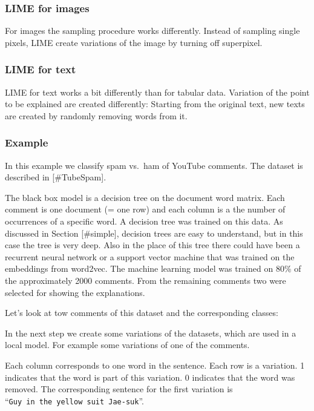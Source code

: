 \documentclass[12pt,]{krantz}
\theoremstyle{definition}
\theoremstyle{definition}
\theoremstyle{definition}
\theoremstyle{remark}
\begin{document}
\subsubsection{LIME for images}\label{lime-for-images}

For images the sampling procedure works differently. Instead of sampling
single pixels, LIME create variations of the image by turning off
superpixel.

\subsubsection{LIME for text}\label{lime-for-text}

LIME for text works a bit differently than for tabular data. Variation
of the point to be explained are created differently: Starting from the
original text, new texts are created by randomly removing words from it.

\subsubsection{Example}\label{example-4}

In this example we classify spam vs.~ham of YouTube comments. The
dataset is described in {[}\#TubeSpam{]}.

The black box model is a decision tree on the document word matrix. Each
comment is one document (= one row) and each column is a the number of
occurrences of a specific word. A decision tree was trained on this
data. As discussed in Section {[}\#simple{]}, decision trees are easy to
understand, but in this case the tree is very deep. Also in the place of
this tree there could have been a recurrent neural network or a support
vector machine that was trained on the embeddings from word2vec. The
machine learning model was trained on 80\% of the approximately 2000
comments. From the remaining comments two were selected for showing the
explanations.

Let's look at tow comments of this dataset and the corresponding
classes:

\hypertarget{htmlwidget-a7e2e3f97b18ee50788e}{}

In the next step we create some variations of the datasets, which are
used in a local model. For example some variations of one of the
comments.

\hypertarget{htmlwidget-d2a25d7a243dd7d0fdba}{}

Each column corresponds to one word in the sentence. Each row is a
variation. 1 indicates that the word is part of this variation. 0
indicates that the word was removed. The corresponding sentence for the
first variation is ``\texttt{Guy\ in\ the\ yellow\ suit\ Jae-suk}''.
\end{document}
